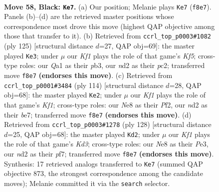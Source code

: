 \documentclass[11pt]{article}
\begin{document}
\clearpage

\begin{figure}[p]\centering
\begin{subfigure}{0.46\textwidth}\centering
\resizebox{\linewidth}{!}{%
\newchessgame
\chessboard[
  setfen={1n2nk2/8/7Q/8/P7/7K/3N4/q7 b - - 0 58},
  showmover=false,
  pgfstyle=straightmove, color=movearrow, markmove={f8-e7}
]}
\caption{}
\end{subfigure}\hfill
\begin{subfigure}{0.46\textwidth}\centering
\resizebox{\linewidth}{!}{%
\newchessgame
\chessboard[
  setfen={8/8/3Q4/8/1K3k2/1P3n2/2P1p3/8 b - - 10 63},
  showmover=false,
  pgfstyle=straightmove, color=movearrow, markmove={f4-e3}
]}
\caption{}
\end{subfigure}
\\[4pt]
\begin{subfigure}{0.46\textwidth}\centering
\resizebox{\linewidth}{!}{%
\newchessgame
\chessboard[
  setfen={2Q5/4b2p/7k/8/8/4N3/5P2/5K1q w - - 8 58},
  showmover=false,
  pgfstyle=straightmove, color=movearrow, markmove={f1-e2}
]}
\caption{}
\end{subfigure}\hfill
\begin{subfigure}{0.46\textwidth}\centering
\resizebox{\linewidth}{!}{%
\newchessgame
\chessboard[
  setfen={1Q6/5p2/8/8/8/3KP2k/8/5q2 w - - 3 65},
  showmover=false,
  pgfstyle=straightmove, color=movearrow, markmove={d3-d2}
]}
\caption{}
\end{subfigure}
\caption{\textbf{Move 58, Black: \texttt{Ke7}.} (a) Our position; Melanie plays \texttt{Ke7} (\texttt{f8e7}). Panels (b)--(d) are the retrieved master positions whose correspondence most drove this move (highest QAP objective among those that transfer to it). (b) Retrieved from \texttt{ccrl\_top\_p0003\#1082} (ply 125) [structural distance $d$=27, QAP obj=69]: the master played \texttt{Ke3}; under $\mu$ our \emph{Kf1} plays the role of that game's \emph{Kf5}; cross-type roles: our \emph{Q}a1 as their \emph{p}b3, our \emph{n}d2 as their \emph{p}c2; transferred move \texttt{f8e7} \textbf{(endorses this move)}. (c) Retrieved from \texttt{ccrl\_top\_p0001\#3484} (ply 114) [structural distance $d$=28, QAP obj=68]: the master played \texttt{Ke2}; under $\mu$ our \emph{Kf1} plays the role of that game's \emph{Kf1}; cross-type roles: our \emph{N}e8 as their \emph{P}f2, our \emph{n}d2 as their \emph{b}e7; transferred move \texttt{f8e7} \textbf{(endorses this move)}. (d) Retrieved from \texttt{ccrl\_top\_p0003\#1278} (ply 128) [structural distance $d$=25, QAP obj=68]: the master played \texttt{Kd2}; under $\mu$ our \emph{Kf1} plays the role of that game's \emph{Kd3}; cross-type roles: our \emph{N}e8 as their \emph{P}e3, our \emph{n}d2 as their \emph{p}f7; transferred move \texttt{f8e7} \textbf{(endorses this move)}. Synthesis: 17 retrieved analogs transferred to \texttt{Ke7} (summed QAP objective 873, the strongest correspondence among the candidate moves); Melanie committed it via the \texttt{search} selector.}
\label{fig:thought-m115}
\end{figure}
\end{document}
